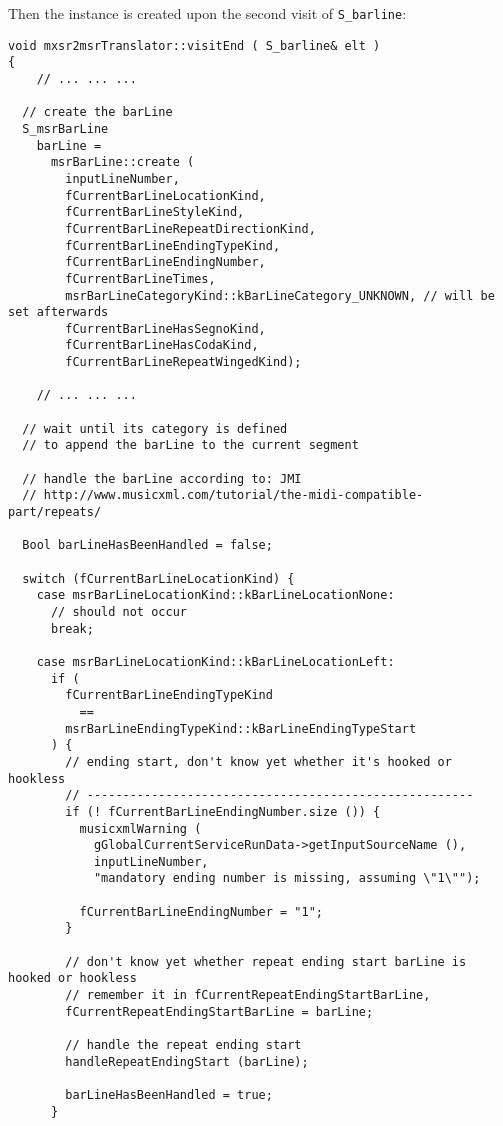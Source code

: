Then the  instance is created upon the second visit of {\tt S_barline}:%
\begin{lstlisting}[language=CPlusPlus]
void mxsr2msrTranslator::visitEnd ( S_barline& elt )
{
	// ... ... ...

  // create the barLine
  S_msrBarLine
    barLine =
      msrBarLine::create (
        inputLineNumber,
        fCurrentBarLineLocationKind,
        fCurrentBarLineStyleKind,
        fCurrentBarLineRepeatDirectionKind,
        fCurrentBarLineEndingTypeKind,
        fCurrentBarLineEndingNumber,
        fCurrentBarLineTimes,
        msrBarLineCategoryKind::kBarLineCategory_UNKNOWN, // will be set afterwards
        fCurrentBarLineHasSegnoKind,
        fCurrentBarLineHasCodaKind,
        fCurrentBarLineRepeatWingedKind);

	// ... ... ...

  // wait until its category is defined
  // to append the barLine to the current segment

  // handle the barLine according to: JMI
  // http://www.musicxml.com/tutorial/the-midi-compatible-part/repeats/

  Bool barLineHasBeenHandled = false;

  switch (fCurrentBarLineLocationKind) {
    case msrBarLineLocationKind::kBarLineLocationNone:
      // should not occur
      break;

    case msrBarLineLocationKind::kBarLineLocationLeft:
      if (
        fCurrentBarLineEndingTypeKind
          ==
        msrBarLineEndingTypeKind::kBarLineEndingTypeStart
      ) {
        // ending start, don't know yet whether it's hooked or hookless
        // ------------------------------------------------------
        if (! fCurrentBarLineEndingNumber.size ()) {
          musicxmlWarning (
            gGlobalCurrentServiceRunData->getInputSourceName (),
            inputLineNumber,
            "mandatory ending number is missing, assuming \"1\"");

          fCurrentBarLineEndingNumber = "1";
        }

        // don't know yet whether repeat ending start barLine is hooked or hookless
        // remember it in fCurrentRepeatEndingStartBarLine,
        fCurrentRepeatEndingStartBarLine = barLine;

        // handle the repeat ending start
        handleRepeatEndingStart (barLine);

        barLineHasBeenHandled = true;
      }


\end{lstlisting}
